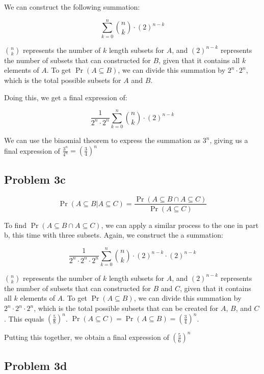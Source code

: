 \documentclass{article}
\begin{document}
We can construct the following summation:

$$\sum_{k = 0}^{n} \binom{n}{k} \cdot (2)^{n - k}$$

\noindent $\binom{n}{k}$ represents the number of $k$ length subsets for $A$, and $(2)^{n - k}$ represents the number of subsets that can constructed for $B$, given that it contains all $k$ elements of $A$. To get $\Pr(A  \subseteq B)$, we can divide this summation by $2^n \cdot 2^n$, which is the total possible subsets for $A$ and $B$.

\noindent Doing this, we get a final expression of:

$$\frac{1}{2^n \cdot 2^n}\sum_{k = 0}^{n} \binom{n}{k} \cdot (2)^{n - k}$$

\noindent We can use the binomial theorem to express the summation as $3^n$, giving us a final expression of $\frac{3^n}{4^n} = \boxed{\left(\frac{3}{4} \right)^n}$

\subsection{Problem 3c}

$$\Pr(A \subseteq B | A \subseteq C) = \frac{\Pr(A \subseteq B \cap A \subseteq C)}{\Pr(A \subseteq C)}$$

\noindent To find $\Pr(A \subseteq B \cap A \subseteq C)$, we can apply a similar process to the one in part b, this time with three subsets. Again, we construct the a summation:

$$\frac{1}{2^n \cdot 2^n \cdot 2^n}\sum_{k = 0}^{n} \binom{n}{k} \cdot (2)^{n - k} \cdot (2)^{n - k}$$

\noindent $\binom{n}{k}$ represents the number of $k$ length subsets for $A$, and $(2)^{n - k}$ represents the number of subsets that can constructed for $B$ and $C$, given that it contains all $k$ elements of $A$. To get $\Pr(A  \subseteq B)$, we can divide this summation by $2^n \cdot 2^n \cdot 2^n$, which is the total possible subsets that can be created for $A$, $B$, and $C$. This equals $\left(\frac{5}{8} \right)^n$. \noindent $\Pr(A \subseteq C) = \Pr(A \subseteq B) = \left(\frac{3}{4} \right)^n$.

\noindent Putting this together, we obtain a final expression of $\boxed{\left(\frac{5}{6} \right)^n}$

\subsection{Problem 3d}
\end{document}
